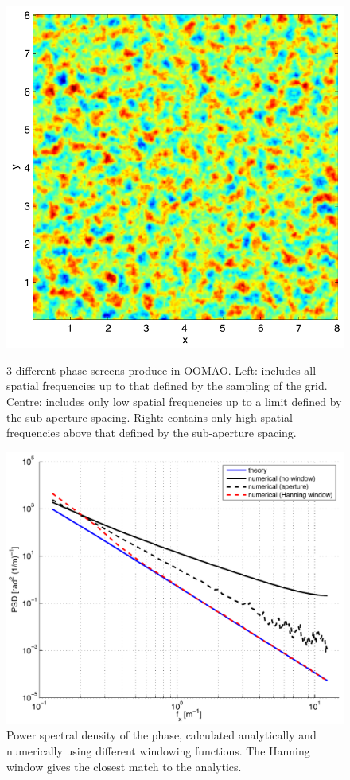 \documentclass[pdf]{note}
\begin{document}
\begin{figure}[htbp]
{      \includegraphics[scale=.4]{plots/HO_phase}
    }
    \caption{3 different phase screens produce in OOMAO.  Left: includes all
    	spatial frequencies up to that defined by the sampling of the grid.  Centre:
	includes only low spatial frequencies up to a limit defined by the sub-aperture
	spacing.  Right: contains only high spatial frequencies above that defined by the
	sub-aperture spacing.
    }
    \label{fig:phase_screens}
\end{figure}



\begin{figure}[htbp]
    \centerline{
      \includegraphics[scale=.6]{plots/phase_PSDs1}
    }
    \caption{Power spectral density of the phase, calculated analytically and numerically
    	using different windowing functions.  The Hanning window gives the closest match to
	the analytics.
    }
    \label{fig:phasePSD1}
\end{figure}
\end{document}
